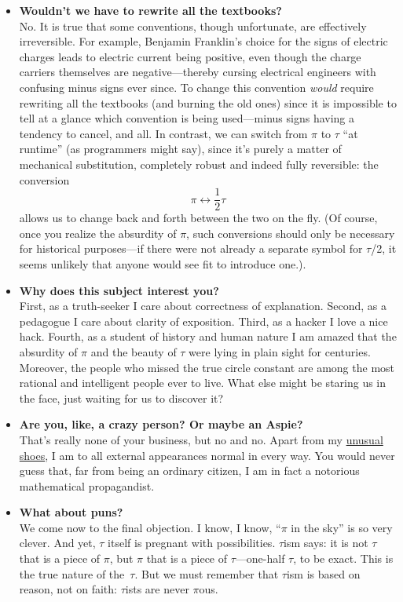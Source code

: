 \documentclass{article}
\begin{document}
\begin{itemize}
  \item \textbf{Wouldn't we have to rewrite all the textbooks?} \\ No. It is true that some conventions, though unfortunate, are effectively irreversible. For example, Benjamin Franklin's choice for the signs of electric charges leads to electric current being positive, even though the charge carriers themselves are negative---thereby cursing electrical engineers with confusing minus signs ever since. To change this convention \emph{would} require rewriting all the textbooks (and burning the old ones) since it is impossible to tell at a glance which convention is being used---minus signs having a tendency to cancel, and all. In contrast, we can switch from $\pi$ to $\tau$ ``at runtime'' (as programmers might say), since it's purely a matter of mechanical substitution, completely robust and indeed fully reversible: the conversion \[ \pi \leftrightarrow \textstyle{\frac{1}{2}}\tau \] allows us to change back and forth between the two on the fly. (Of course, once you realize the absurdity of $\pi$, such conversions should only be necessary for historical purposes---if there were not already a separate symbol for $\tau$/2, it seems unlikely that anyone would see fit to introduce one.).
  
  \item \textbf{Why does this subject interest you?} \\ First, as a truth-seeker I care about correctness of explanation. Second, as a pedagogue I care about clarity of exposition. Third, as a hacker I love a nice hack. Fourth, as a student of history and human nature I am amazed that the absurdity of $\pi$ and the beauty of $\tau$ were lying in plain sight for centuries. Moreover, the people who missed the true circle constant are among the most rational and intelligent people ever to live. What else might be staring us in the face, just waiting for us to discover it?
  
  \item \textbf{Are you, like, a crazy person? Or maybe an Aspie?} \\ That's really none of your business, but no and no. Apart from my \href{http://www.vibramfivefingers.com/}{unusual shoes}, I am to all external appearances normal in every way. You would never guess that, far from being an ordinary citizen, I am in fact a notorious mathematical propagandist.
  
  \item \textbf{What about puns?} \\ We come now to the final objection. I know, I know, ``$\pi$ in the sky'' is so very clever. And yet, $\tau$ itself is pregnant with possibilities. $\tau$ism says: it is not $\tau$ that is a piece of $\pi$, but $\pi$ that is a piece of $\tau$---one-half $\tau$, to be exact. This is the true nature of the~$\tau$. But we must remember that $\tau$ism is based on reason, not on faith: $\tau$ists are never $\pi$ous.

\end{itemize}
\end{document}
